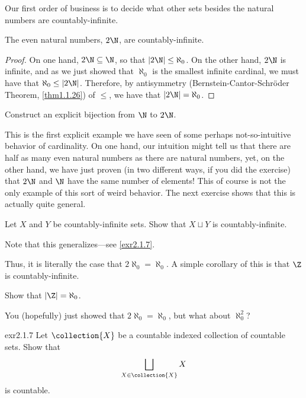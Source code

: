 Our first order of business is to decide what other sets besides the natural numbers are countably-infinite.
\begin{prp}{}{}
	The even natural numbers, $2\N$, are countably-infinite.
	\begin{proof}
		On one hand, $2\N \subseteq \N$, so that $|2\N |\leq \aleph _0$.  On the other hand, $2\N$ is infinite, and as we just showed that $\aleph _0$ is the smallest infinite cardinal, we must have that $\aleph _0\leq |2\N |$.  Therefore, by antisymmetry (Bernstein-Cantor-Schr\"{o}der Theorem, \cref{thm1.1.26}) of $\leq$, we have that $|2\N |=\aleph _0$.
	\end{proof}
\end{prp}
\begin{exr}{}{}
	Construct an explicit bijection from $\N$ to $2\N$.
\end{exr}
This is the first explicit example we have seen of some perhaps not-so-intuitive behavior of cardinality.  On one hand, our intuition might tell us that there are half as many even natural numbers as there are natural numbers, yet, on the other hand, we have just proven (in two different ways, if you did the exercise) that $2\N$ and $\N$ have the same number of elements!  This of course is not the only example of this sort of weird behavior.  The next exercise shows that this is actually quite general.
\begin{exr}{}{}
	Let $X$ and $Y$ be countably-infinite sets.  Show that $X\sqcup Y$ is countably-infinite.
	\begin{rmk}
		Note that this generalizes---see \cref{exr2.1.7}.
	\end{rmk}
\end{exr}
Thus, it is literally the case that $2\aleph _0=\aleph _0$.  A simple corollary of this is that $\Z$ is countably-infinite.
\begin{exr}{}{}
	Show that $|\Z |=\aleph _0$.
\end{exr}

You (hopefully) just showed that $2\aleph _0=\aleph _0$, but what about $\aleph _0^2$?
\begin{exr}{}{exr2.1.7}
	Let $\collection{X}$ be a countable indexed collection of countable sets.  Show that
	\begin{equation}
	\bigsqcup _{X\in \collection{X}}X
	\end{equation}
	is countable.
\end{exr}

